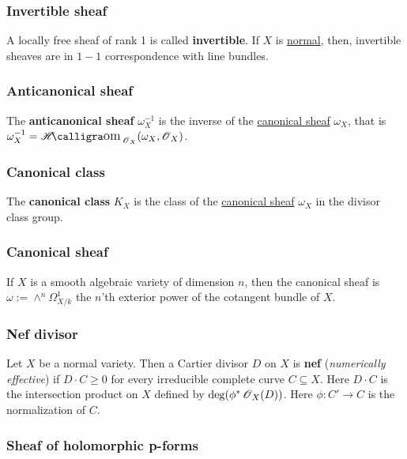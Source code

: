 \documentclass[11pt, english]{article}
\begin{document}
\subsubsection{Invertible sheaf}
\label{invertiblesheaf}
A locally free sheaf of rank 1 is called \textbf{invertible}. If $X$ is \hyperref[normalvariety]{normal}, then, invertible sheaves are in $1-1$ correspondence with line bundles.  

\subsubsection{Anticanonical sheaf}
\label{anticanonical}

The \textbf{anticanonical sheaf} $\omega_X^{-1}$ is the inverse of the \hyperref[canonicalsheaf]{canonical sheaf} $\omega_X$, that is $\omega_X^{-1} = \Shom_{\OO_X}(\omega_X,\OO_X)$.

\subsubsection{Canonical class}
\label{canonicaldivisor}

The \textbf{canonical class} $K_X$ is the class of the \hyperref[canonicalsheaf]{canonical sheaf} $\omega_X$ in the divisor class group.

\subsubsection{Canonical sheaf}
\label{canonicalsheaf} 

If $X$ is a smooth algebraic variety of dimension $n$, then the canonical sheaf is $\omega := \wedge^n \Omega^1_{X/k}$ the $n$'th exterior power of the cotangent bundle of $X$.

\subsubsection{Nef divisor}
\label{nef}

Let $X$ be a normal variety. Then a Cartier divisor $D$ on $X$ is \textbf{nef} (\emph{numerically effective}) if $D \cdot C \geq 0$ for every irreducible complete curve $C \subseteq X$. Here $D \cdot C$ is the intersection product on $X$ defined by $\deg(\phi^\ast \operatorname{\mathscr{O}}_X(D))$. Here $\phi:C' \to C$ is the normalization of $C$. 

\subsubsection{Sheaf of holomorphic p-forms}
\label{pforms}
\end{document}
